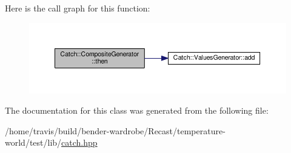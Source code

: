 Here is the call graph for this function\-:
\nopagebreak
\begin{figure}[H]
\begin{center}
\leavevmode
\includegraphics[width=350pt]{class_catch_1_1_composite_generator_aefdc11bcfccdf07d2db5f0da3ed8758c_cgraph}
\end{center}
\end{figure}




The documentation for this class was generated from the following file\-:\begin{DoxyCompactItemize}
\item 
/home/travis/build/bender-\/wardrobe/\-Recast/temperature-\/world/test/lib/\hyperlink{catch_8hpp}{catch.\-hpp}\end{DoxyCompactItemize}
